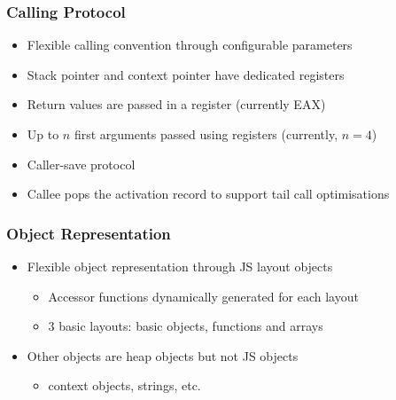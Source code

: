 \begin{frame}
\frametitle{\bf Calling Protocol}

\begin{itemize}
    \item Flexible calling convention through configurable parameters
    \item Stack pointer and context pointer have dedicated registers
    \item Return values are passed in a register (currently EAX)
    \item Up to $n$ first arguments passed using registers (currently, $n =
    4$)
    \item Caller-save protocol
    \item Callee pops the activation record to support tail call optimisations
\end{itemize}
\end{frame}

\begin{frame}
\frametitle{\bf Object Representation}

\begin{itemize}
    \item Flexible object representation through JS layout objects
    \begin{itemize}
        \item Accessor functions dynamically generated for each layout
        \item 3 basic layouts: basic objects, functions and arrays
    \end{itemize}
    \item Other objects are heap objects but not JS objects
    \begin{itemize}
        \item context objects, strings, etc.
    \end{itemize}
\end{itemize}



\end{frame}


